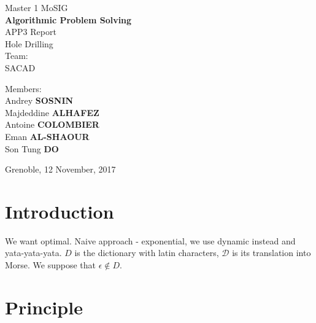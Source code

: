 \documentclass{article}
\begin{document}
\begin{titlepage}
\begin{center}

\vspace*{10cm}
{\large Master 1 MoSIG}\\[0.5cm]

{\Huge \textbf{Algorithmic Problem Solving} }\\[0.5cm]
{\large APP3 Report}\\
Hole Drilling\\ 
Team:\\SACAD
\vfill

\noindent
\begin{minipage}{0.4\textwidth}
   \centering Members:\\
   Andrey \textbf{SOSNIN}\\
   Majdeddine \textbf{ALHAFEZ}\\
   Antoine \textbf{COLOMBIER}\\
   Eman \textbf{AL-SHAOUR}\\
   Son Tung \textbf{DO}\\
\end{minipage}%

\vfill
{Grenoble, 12 November, 2017}
\end{center}
\end{titlepage}
\clearpage

\section{Introduction}
We want optimal. Naive approach - exponential, we use dynamic instead and yata-yata-yata. $D$ is the dictionary with latin characters, $\mathcal{D}$ is its translation into Morse. We suppose that $\epsilon \notin D$.

\section{Principle}
\end{document}
